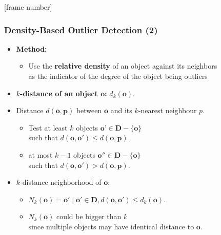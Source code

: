 \documentclass[aspectratio=169,t,xcolor=dvipsnames]{beamer}
\begin{document}
{
  [frame number]
  \begin{frame}
  	\frametitle{Density-Based Outlier Detection (2)}
  	\begin{itemize}
  		\item \textbf{Method:}
  		      \begin{itemize}
  		      	\item Use the \textbf{relative density} of an object against its neighbors \\
              as the indicator of the degree of the object being outliers
  		      \end{itemize}
    	\item \textbf{{\color{airforceblue}$k$-distance} of an object $\mathbf{o}$:} $d_k(\mathbf{o})$.
  		\item Distance $d(\mathbf{o}, \mathbf{p})$ between $\mathbf{o}$ and its $k$-nearest neighbour $p$.
  		      \begin{itemize}
  		      \item Test at least $k$ objects $\textbf{o'} \in \mathbf{D} - \{\mathbf{o}\}$ \\
            such that $d(\mathbf{o}, \mathbf{o'}) \leq d(\mathbf{o}, \mathbf{p})$.
  		      \item at most $k-1$ objects $\mathbf{o''} \in \mathbf{D} - \{\mathbf{o}\}$ \\
            such that $d(\mathbf{o}, \mathbf{o'}) > d(\mathbf{o}, \mathbf{p})$.
  		      \end{itemize}
  		\item $k$-distance neighborhood of $\mathbf{o}$:
  		      \begin{itemize}
  		      	\item $N_k(\mathbf{o}) = {\mathbf{o'} \; \vert \; \mathbf{o'} \in \mathbf{D}, d(\mathbf{o}, \mathbf{o'}) \leq d_k(\mathbf{o})}$.
  		      	\item $N_k(\mathbf{o})$ could be bigger than $k$ \\
              since multiple objects may have identical distance to $\mathbf{o}$.
            \end{itemize}
          \end{itemize}
  \end{frame}
}
\end{document}
